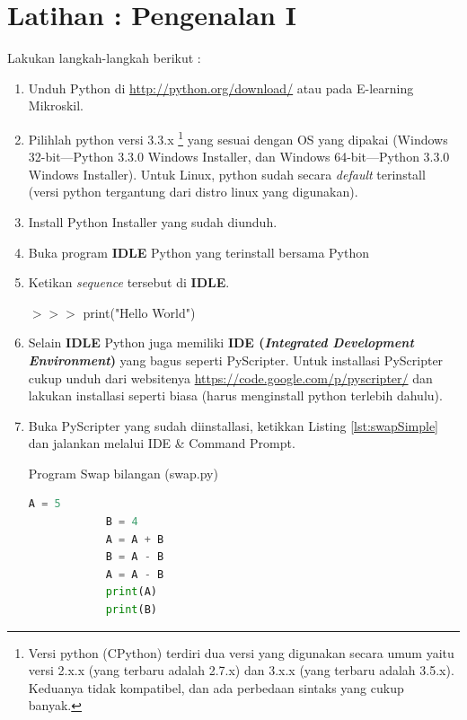\section{Latihan : Pengenalan I}

\begin{pemrograman}
Lakukan langkah-langkah berikut :
\begin{enumerate}
	\item Unduh Python di \url{http://python.org/download/} atau pada E-learning Mikroskil.
	\item Pilihlah python versi 3.3.x \footnote{Versi python (CPython) terdiri dua versi yang digunakan secara umum yaitu versi 2.x.x (yang terbaru adalah 2.7.x) dan 3.x.x (yang terbaru adalah 3.5.x). Keduanya tidak kompatibel, dan ada perbedaan sintaks yang cukup banyak.} yang sesuai dengan OS yang dipakai (Windows 32-bit---Python 3.3.0 Windows Installer, dan Windows 64-bit---Python 3.3.0 Windows Installer). Untuk Linux, python sudah secara \textit{default} terinstall (versi python tergantung dari distro linux yang digunakan).
	\item Install Python Installer yang sudah diunduh.
	\item Buka program \textbf{IDLE} Python yang terinstall bersama Python	
	\item Ketikan \textit{sequence} tersebut di \textbf{IDLE}.
	\begin{IDLE}
	\begin{tabbing}
	$>>>$ print("Hello World")
	\end{tabbing}
	\end{IDLE}
	\item Selain \textbf{IDLE} Python juga memiliki \textbf{IDE (\textit{Integrated Development Environment})} yang bagus seperti PyScripter. Untuk installasi PyScripter cukup unduh dari websitenya \url{https://code.google.com/p/pyscripter/} dan lakukan installasi seperti biasa (harus menginstall python terlebih dahulu).
	\item Buka PyScripter yang sudah diinstallasi, ketikkan Listing \ref{lst:swapSimple} dan jalankan melalui IDE \& Command Prompt.
		\begin{listprog}{Program Swap bilangan (swap.py)}
		\label{lst:swapSimple}
		\begin{lstlisting}[language=Python]
			A = 5
			B = 4
			A = A + B
			B = A - B
			A = A - B
			print(A)
			print(B)
		\end{lstlisting}
\end{listprog}
\end{enumerate}
\end{pemrograman}